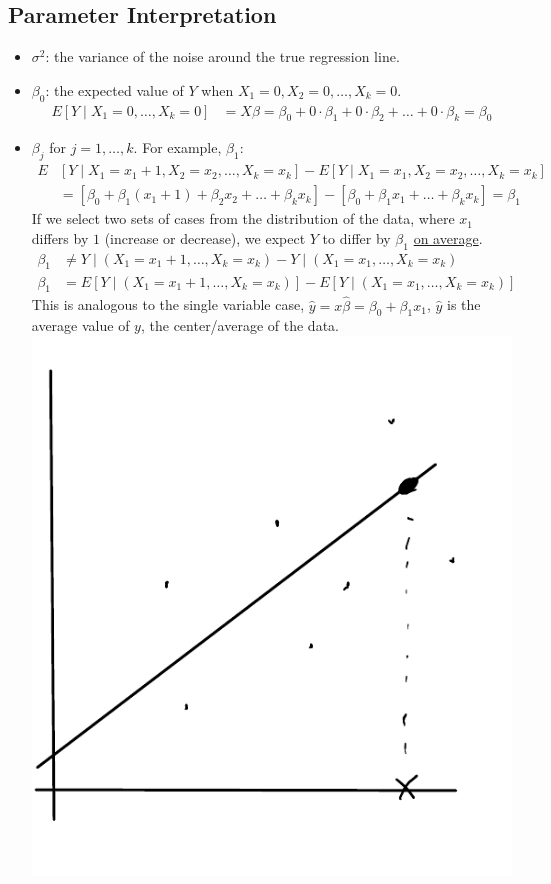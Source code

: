 \documentclass[12 pt]{article}
\begin{document}
  \subsection{Parameter Interpretation}
  \begin{itemize}
  \item $\sigma^2$: the variance of the noise around the true
    regression line.
  \item $\beta_0$: the expected value of $Y$ when $X_1 =0, X_2 = 0,
    \ldots, X_k = 0$.
    \begin{align*}
      E[Y \mid X_1 = 0, \ldots, X_k = 0] & = X\beta = \beta_0 + 0 \cdot \beta_1 + 0\cdot \beta_2 + \ldots + 0 \cdot \beta_k = \beta_0
    \end{align*}
  \item $\beta_j$ for $j = 1, \ldots, k$. For example, $\beta_1$:
    \begin{align*}
      E&[Y \mid X_1 = x_1 + 1, X_2 = x_2, \ldots, X_k = x_k] - E[Y \mid X_1 = x_1, X_2 = x_2, \ldots, X_k = x_k]
                                                              \\&= \left[\beta_0 + \beta_1 (x_1 + 1) + \beta_2 x_2 + \ldots + \beta_k x_k\right] - \left[\beta_0 + \beta_1 x_1 + \ldots + \beta_k x_k\right] = \beta_1
    \end{align*}
    If we select two sets of cases from the distribution of the data,
    where $x_1$ differs by $1$ (increase or decrease), we expect $Y$
    to differ by $\beta_1$ \underline{on average}.
    \begin{align*}
    \beta_1 &\neq Y \mid (X_1 = x_1 + 1, \ldots, X_k = x_k) - Y \mid (X_1 = x_1, \ldots, X_k = x_k)
    \\\beta_1 &= E \left[Y \mid (X_1 = x_1 + 1, \ldots, X_k = x_k)\right] - E\left[Y \mid (X_1 = x_1, \ldots, X_k = x_k)\right]
    \end{align*}
    This is analogous to the single variable case, $\hat{y} =
    x\hat{\beta} = \beta_0 + \beta_1 x_1$, $\hat{y}$ is the average
    value of $y$, the center/average of the data.\\
    \includegraphics[width=.6\textwidth]{26.pdf}
  \end{itemize}
\end{document}

